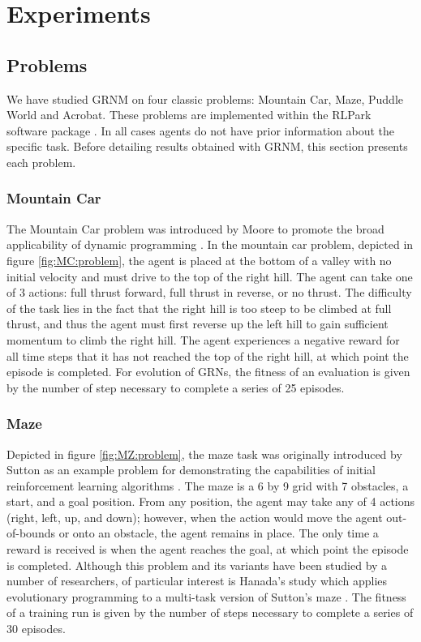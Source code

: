 \section{Experiments}


\subsection{Problems}

We have studied GRNM on four classic problems: Mountain Car, Maze, Puddle World and Acrobat. These problems are implemented within the RLPark software package \cite{Degris2014}. In all cases agents do not have prior information about the specific task. Before detailing results obtained with GRNM, this section presents each problem.
\subsubsection{Mountain Car}
The Mountain Car problem was introduced by Moore to promote the broad applicability of dynamic programming \cite{Moore1991}. In the mountain car problem, depicted in figure \ref{fig:MC:problem}, the agent is placed at the bottom of a valley with no initial velocity and must drive to the top of the right hill. The agent can take one of 3 actions: full thrust forward, full thrust in reverse, or no thrust. The difficulty of the task lies in the fact that the right hill is too steep to be climbed at full thrust, and thus the agent must first reverse up the left hill to gain sufficient momentum to climb the right hill. The agent experiences a negative reward for all time steps that it has not reached the top of the right hill, at which point the episode is completed. For evolution of GRNs, the fitness of an evaluation is given by the number of step necessary to complete a series of 25 episodes.

\subsubsection{Maze}

Depicted in figure \ref{fig:MZ:problem}, the maze task was originally introduced by Sutton as an example problem for demonstrating the capabilities of initial reinforcement learning algorithms \cite{Sutton1990}. The maze is a 6 by 9 grid with 7 obstacles, a start, and a goal position. From any position, the agent may take any of 4 actions (right, left, up, and down); however, when the action would move the agent out-of-bounds or onto an obstacle, the agent remains in place. The only time a reward is received is when the agent reaches the goal, at which point the episode is completed. Although this problem and its variants have been studied by a number of researchers, of particular interest is Hanada's study which applies evolutionary programming to a multi-task version of Sutton's maze \cite{Handa2007}. The fitness of a training run is given by the number of steps necessary to complete a series of 30 episodes.


